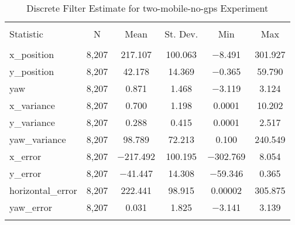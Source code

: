 
\begin{table}[h] \centering 
  \caption{Discrete Filter Estimate for two-mobile-no-gps Experiment} 
  \label{tab:two_mobile_no_gps_discrete_summary} 
\begin{tabular}{@{\extracolsep{5pt}}lccccc} 
\\[-1.8ex]\hline 
\hline \\[-1.8ex] 
Statistic & \multicolumn{1}{c}{N} & \multicolumn{1}{c}{Mean} & \multicolumn{1}{c}{St. Dev.} & \multicolumn{1}{c}{Min} & \multicolumn{1}{c}{Max} \\ 
\hline \\[-1.8ex] 
x\_position & 8,207 & 217.107 & 100.063 & $-$8.491 & 301.927 \\ 
y\_position & 8,207 & 42.178 & 14.369 & $-$0.365 & 59.790 \\ 
yaw & 8,207 & 0.871 & 1.468 & $-$3.119 & 3.124 \\ 
x\_variance & 8,207 & 0.700 & 1.198 & 0.0001 & 10.202 \\ 
y\_variance & 8,207 & 0.288 & 0.415 & 0.0001 & 2.517 \\ 
yaw\_variance & 8,207 & 98.789 & 72.213 & 0.100 & 240.549 \\ 
x\_error & 8,207 & $-$217.492 & 100.195 & $-$302.769 & 8.054 \\ 
y\_error & 8,207 & $-$41.447 & 14.308 & $-$59.346 & 0.365 \\ 
horizontal\_error & 8,207 & 222.441 & 98.915 & 0.00002 & 305.875 \\ 
yaw\_error & 8,207 & 0.031 & 1.825 & $-$3.141 & 3.139 \\ 
\hline \\[-1.8ex] 
\end{tabular} 
\end{table} 
